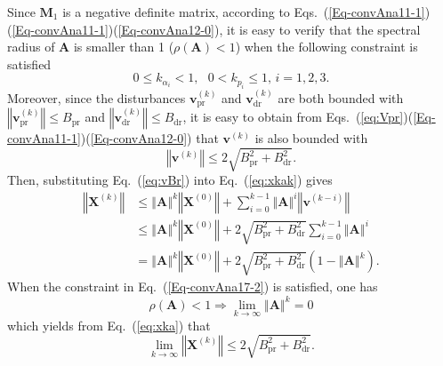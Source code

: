 Since $\mathbf{M}_{1}$ is a negative definite matrix, according to
Eqs.\ (\ref{Eq-convAna11-1})(\ref{Eq-convAna11-1})(\ref{Eq-convAna12-0}),
it is easy to verify that the spectral radius of $\mathbf{A}$ is
smaller than 1 ($\rho\left(\mathbf{A}\right)<1$) when the following
constraint is satisfied
\begin{equation}
0\leq k_{\alpha_{i}}<1,\text{ }0<k_{p_{i}}\leq1\text{, }i=1,2,3.\label{Eq-convAna17-2}
\end{equation}
Moreover, since the disturbances $\mathbf{v}_{\text{pr}}^{\left(k\right)}$
and $\mathbf{v}_{\text{dr}}^{\left(k\right)}$ are both bounded with
$\left\Vert \mathbf{v}_{\text{pr}}^{\left(k\right)}\right\Vert \leq B_{\text{pr}}$
and $\left\Vert \mathbf{v}_{\text{dr}}^{\left(k\right)}\right\Vert \leq B_{\text{dr}}$,
it is easy to obtain from Eqs.\ (\ref{eq:Vpr})(\ref{Eq-convAna11-1})(\ref{Eq-convAna12-0})
that $\mathbf{v}^{\left(k\right)}$ is also bounded with
\begin{equation}
\left\Vert \mathbf{v}^{\left(k\right)}\right\Vert \leq2\sqrt{B_{\text{pr}}^{2}+B_{\text{dr}}^{2}}.\label{eq:vBr}
\end{equation}
Then, substituting Eq.\ (\ref{eq:vBr}) into Eq.\ (\ref{eq:xkak})
gives
\begin{equation}
\begin{array}{ll}
\left\Vert \mathbf{X}^{\left(k\right)}\right\Vert  & \leq\left\Vert \mathbf{A}\right\Vert ^{k}\left\Vert \mathbf{X}^{\left(0\right)}\right\Vert +\sum_{i=0}^{k-1}\left\Vert \mathbf{A}\right\Vert ^{i}\left\Vert \mathbf{v}^{\left(k-i\right)}\right\Vert \\
& \leq\left\Vert \mathbf{A}\right\Vert ^{k}\left\Vert \mathbf{X}^{\left(0\right)}\right\Vert +2\sqrt{B_{\text{pr}}^{2}+B_{\text{dr}}^{2}}\sum_{i=0}^{k-1}\left\Vert \mathbf{A}\right\Vert ^{i}\\
& =\left\Vert \mathbf{A}\right\Vert ^{k}\left\Vert \mathbf{X}^{\left(0\right)}\right\Vert +2\sqrt{B_{\text{pr}}^{2}+B_{\text{dr}}^{2}}\left(1-\left\Vert \mathbf{A}\right\Vert ^{k}\right).
\end{array}\label{eq:xka}
\end{equation}
When the constraint in Eq.\ (\ref{Eq-convAna17-2}) is satisfied,
one has
\begin{equation}
\rho\left(\mathbf{A}\right)<1\Rightarrow\lim_{k\rightarrow\infty}\left\Vert \mathbf{A}\right\Vert ^{k}=0
\end{equation}
which yields from Eq.\ (\ref{eq:xka}) that
\begin{equation}
\lim_{k\rightarrow\infty}\left\Vert \mathbf{X}^{\left(k\right)}\right\Vert \leq2\sqrt{B_{\text{pr}}^{2}+B_{\text{dr}}^{2}}.\label{eq:xk46}
\end{equation}

